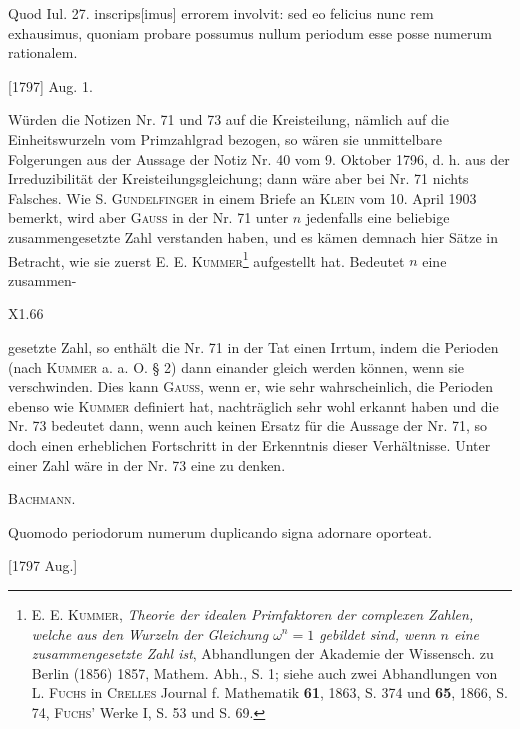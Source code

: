 \indent Quod Iul. 27. inscrips[imus] errorem involvit: sed eo felicius nunc rem exhausimus, quoniam probare possumus nullum periodum esse posse numerum rationalem.
\par\noindent\hfill[1797] Aug. 1.

\medskip\begingroup\small
\indent Würden die Notizen Nr. 71 und 73 auf die Kreisteilung, nämlich auf die Einheitswurzeln vom Primzahlgrad bezogen, so wären sie unmittelbare Folgerungen aus der Aussage der Notiz Nr. 40 vom 9. Oktober 1796, d. h. aus der Irreduzibilität der Kreisteilungsgleichung; dann wäre aber bei Nr. 71 nichts Falsches. Wie S. \textsc{Gundelfinger} in einem Briefe an \textsc{Klein} vom 10. April 1903 bemerkt, wird aber \textsc{Gauss} in der Nr. 71 unter \(n\) jedenfalls eine beliebige zusammengesetzte Zahl verstanden haben, und es kämen demnach hier Sätze in Betracht, wie sie zuerst E. E. \textsc{Kummer}\footnote{E. E. \textsc{Kummer}, \textit{Theorie der idealen Primfaktoren der complexen Zahlen, welche aus den Wurzeln der Gleichung \(\omega^n=1\) gebildet sind, wenn \(n\) eine zusammengesetzte Zahl ist}, Abhandlungen der Akademie der Wissensch. zu Berlin (1856) 1857, Mathem. Abh., S. 1; siehe auch zwei Abhandlungen von L. \textsc{Fuchs} in \textsc{Crelles} Journal f. Mathematik \textbf{61}, 1863, S. 374 und \textbf{65}, 1866, S. 74, \textsc{Fuchs}' Werke I, S. 53 und S. 69.} aufgestellt hat. Bedeutet \(n\) eine zusammen-
\par\endgroup
\par\vfill\noindent X1.\hfill66

\clearpage{}
\begingroup\small
\noindent gesetzte Zahl, so enthält die Nr. 71 in der Tat einen Irrtum, indem die Perioden  (nach \textsc{Kummer} a. a. O. § 2) dann einander gleich werden können, wenn sie verschwinden. Dies kann \textsc{Gauss}, wenn er, wie sehr wahrscheinlich, die Perioden ebenso wie \textsc{Kummer} definiert hat, nachträglich sehr wohl erkannt haben und die Nr. 73 bedeutet dann, wenn auch keinen Ersatz für die Aussage der Nr. 71, so doch einen erheblichen Fortschritt in der Erkenntnis dieser Verhältnisse. Unter einer  Zahl wäre in der Nr. 73 eine  zu denken.
\par\noindent\hfill\textsc{Bachmann.}
\par\endgroup

\indent Quomodo periodorum numerum duplicando signa adornare oporteat.
\par\noindent\hfill[1797 Aug.]

